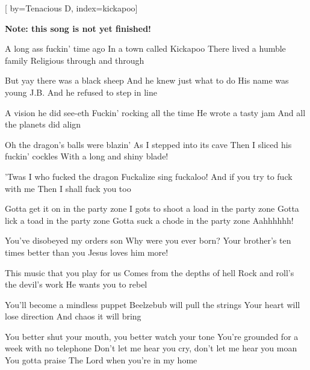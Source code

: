 

[%
    by={Tenacious D},
    index={kickapoo}]


    \label{kickapoo}

    \textbf{Note: this song is not yet finished!}

    \beginverse\memorize[verse]
        A long ass fuckin' time ago
        In a town called Kickapoo
        There lived a humble family
        Religious through and through

        But yay there was a black sheep
        And he knew just what to do
        His name was young J.B.
        And he refused to step in line

        A vision he did see-eth
        Fuckin' rocking all the time
        He wrote a tasty jam
        And all the planets did align
    \endverse

    \beginverse\replay[verse]
        Oh the dragon's balls were blazin'
        As I stepped into its cave
        Then I sliced his fuckin' cockles
        With a long and shiny blade!

        'Twas I who fucked the dragon
        Fuckalize sing fuckaloo!
        And if you try to fuck with me
        Then I shall fuck you too

        Gotta get it on in the party zone
        I gots to shoot a load in the party zone
        Gotta lick a toad in the party zone
        Gotta suck a chode in the party zone
        Aahhhhhh!
    \endverse

    \beginverse\replay[verse]
        You've disobeyed my orders son
        Why were you ever born?
        Your brother's ten times better than you
        Jesus loves him more!

        This music that you play for us
        Comes from the depths of hell
        Rock and roll's the devil's work
        He wants you to rebel

        You'll become a mindless puppet
        Beelzebub will pull the strings
        Your heart will lose direction
        And chaos it will bring

        You better shut your mouth, you better watch your tone
        You're grounded for a week with no telephone
        Don't let me hear you cry, don't let me hear you moan
        You gotta praise The Lord when you're in my home
    \endverse


